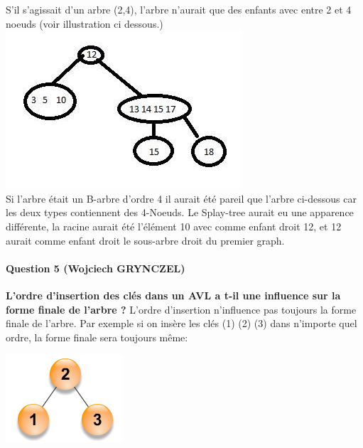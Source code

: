 \documentclass[a4paper]{article}
\begin{document}
S'il s'agissait d'un arbre (2,4), l'arbre n'aurait que des enfants avec entre 2 et 4 noeuds (voir illustration ci dessous.)
\\
\includegraphics[scale=0.6]{arbre1.png}
\\
Si l'arbre était un B-arbre d'ordre 4 il aurait été pareil que l'arbre ci-dessous car les deux types contiennent des 4-Noeuds. Le Splay-tree aurait eu une apparence différente, la racine aurait été l'élément 10 avec comme enfant droit 12, et 12 aurait comme enfant droit le sous-arbre droit du premier graph.
\\

\newpage
\paragraph*{Question 5 (Wojciech GRYNCZEL)\\}
\textbf{L’ordre d’insertion des clés dans un AVL a t-il une influence sur la forme finale de l’arbre ?}
L’ordre d’insertion n’influence pas toujours la forme finale de l’arbre. Par exemple si on insère  les clés  (1) (2) (3) dans n’importe quel ordre, la forme finale sera toujours même: \\
\begin{center}
\includegraphics{tree1}
\end{center}
\end{document}
